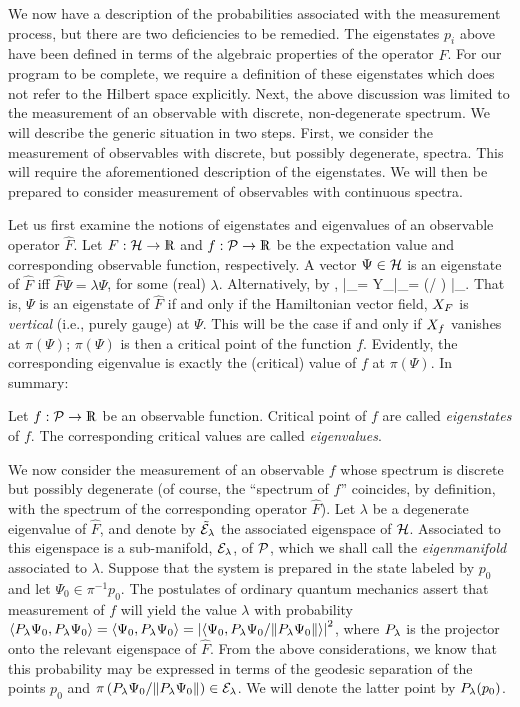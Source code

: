 We now have a description of the probabilities associated with the
measurement process, but there are two deficiencies to be remedied.
The eigenstates $p_i$ above have been defined in terms of the
algebraic properties of the operator $\hat{F}$.  For our program to be
complete, we require a definition of these eigenstates which does not
refer to the Hilbert space explicitly.  Next, the above discussion was
limited to the measurement of an observable with discrete,
non-degenerate spectrum.  We will describe the generic situation in
two steps.  First, we consider the measurement of observables with
discrete, but possibly degenerate, spectra.  This will require the
aforementioned description of the eigenstates.  We will then be
prepared to consider measurement of observables with continuous
spectra.

Let us first examine the notions of eigenstates and eigenvalues of an
observable operator $\hat{F}$. Let $F : \H \rightarrow \R$ and $f :
\P \rightarrow \R$ be the expectation value and corresponding
observable function, respectively.  A vector $\Psi\in\H$ is an
eigenstate of $\hat{F}$ iff $\hat{F}\Psi = \lambda \Psi$, for some
(real) $\lambda$.  Alternatively, by ,
%
\be
{}|_\Psi = Y_{}|_\Psi = (\lambda / \hbar) \J|_\Psi.
\ee
%
That is, $\Psi$ is an eigenstate of $\hat{F}$ if and only if the
Hamiltonian vector field, $\hvf{F}$ is {\em vertical} (i.e., purely
gauge) at $\Psi$.  This will be the case if and only if $\hvf{f}$
vanishes at $\pi(\Psi)$;  $\pi(\Psi)$ is then a critical point of the
function $f$.  Evidently, the corresponding eigenvalue is exactly the
(critical) value of $f$ at $\pi(\Psi)$.  In summary:
%
\begin{definition}
Let $f:\P\rightarrow\R$ be an observable function.  Critical point of
$f$ are called {\em eigenstates} of $f$.  The corresponding critical
values are called {\em eigenvalues}.
\end{definition}

We now consider the measurement of an observable $f$ whose spectrum is
discrete but possibly degenerate (of course, the ``spectrum of $f$''
coincides, by definition, with the spectrum of the corresponding
operator $\hat{F}$).  Let $\lambda$ be a degenerate eigenvalue of
$\hat{F}$, and denote by $\tilde{\cal E}_\lambda$ the associated
eigenspace of $\H$.  Associated to this eigenspace is a sub-manifold,
${\cal E}_\lambda$, of $\P$, which we shall call the {\em
eigenmanifold} associated to $\lambda$.  Suppose that the system is
prepared in the state labeled by $p_0$ and let $\Psi_0 \in
\pi^{-1}p_0$.  The postulates of ordinary quantum mechanics assert
that measurement of $f$ will yield the value $\lambda$ with
probability $\< {\Bbb P}_\lambda \Psi_0, {\Bbb P}_\lambda \Psi_0 \> =
\< \Psi_0, {\Bbb P}_\lambda \Psi_0 \> = \left| \left< \Psi_0, {\Bbb
P}_\lambda \Psi_0 / \| {\Bbb P}_\lambda \Psi_0 \| \right> \right|^2$,
where ${\Bbb P}_\lambda$ is the projector onto the relevant eigenspace
of $\hat{F}$. {}From the above considerations, we know that this
probability may be expressed in terms of the geodesic separation of
the points $p_0$ and $\pi\left( {\Bbb P}_\lambda \Psi_0 / \| {\Bbb
P}_\lambda \Psi_0 \|\right) \in {\cal E}_\lambda$.  We will denote the
latter point by ${\Bbb P}_\lambda(p_0)$.

